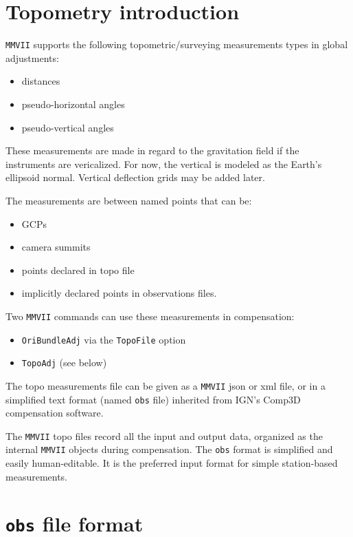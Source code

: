 \section{Topometry introduction}

{\tt MMVII} supports the following topometric/surveying measurements types in global adjustments:

\begin{itemize}
    \item distances
    \item pseudo-horizontal angles
    \item pseudo-vertical angles
\end{itemize}

These measurements are made in regard to the gravitation field if the instruments are vericalized.
For now, the vertical is modeled as the Earth's ellipsoid normal. Vertical deflection grids may be added later.

The measurements are between named points that can be:
\begin{itemize}
    \item GCPs
    \item camera summits
    \item points declared in topo file
    \item implicitly declared points in observations files.
\end{itemize}


Two {\tt MMVII} commands can use these measurements in compensation:
\begin{itemize}
    \item {\tt OriBundleAdj} via the {\tt TopoFile} option
    \item {\tt TopoAdj} (see below)
\end{itemize}

The topo measurements file can be given as a {\tt MMVII} json or xml file, or in a simplified text format (named {\tt obs} file) inherited from IGN's Comp3D compensation software.

The {\tt MMVII} topo files record all the input and output data, organized as the internal {\tt MMVII} objects during compensation.
The {\tt obs} format is simplified and easily human-editable. It is the preferred input format for simple station-based measurements.


\section{{\tt obs} file format}

